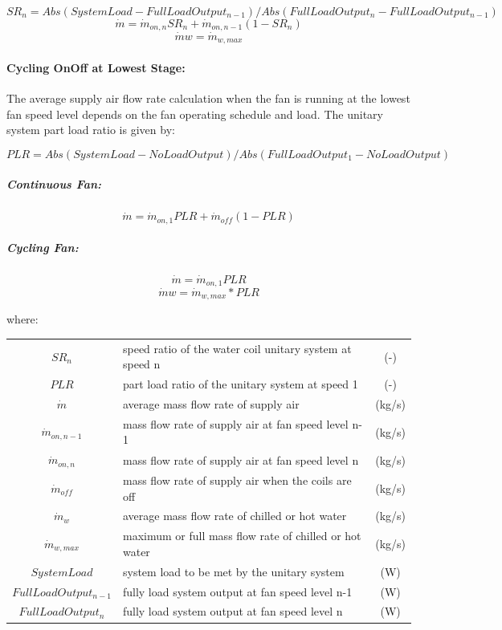\[{SR_{n}} = Abs({SystemLoad} - {FullLoadOutput_{n-1}}) / Abs({FullLoadOutput_{n}} - {FullLoadOutput_{n-1}})\] \[{\dot m} = {\dot m_{on, n}} {SR_{n}} + {\dot m_{on, n-1}} (1 - {SR_{n}})\] \[{\dot m{w}} = {\dot m_{w, max}}\]

\paragraph{Cycling OnOff at Lowest Stage:}\label{cycling-onoff-at-lowest-stage}

The average supply air flow rate calculation when the fan is running at the lowest fan speed level depends on the fan operating schedule and load. The unitary system part load ratio is given by:

\begin{equation}
{PLR} = Abs({SystemLoad} - {NoLoadOutput}) / Abs({FullLoadOutput_{1}} - {NoLoadOutput})
\end{equation}

\subparagraph{Continuous Fan:}\label{continuous-fan}

\begin{equation}
{\dot m} = {\dot m_{on, 1}} {PLR} + {\dot m_{off}} (1 - {PLR})
\end{equation}

\subparagraph{Cycling Fan:}\label{cycling-fan}

\[{\dot m} = {\dot m_{on, 1}} {PLR}\] \[{\dot m{w}} = {\dot m_{w, max}} * {PLR}\]

where:

\begin{tabular}{clc}
  $SR_n$ & speed ratio of the water coil unitary system at speed n & (-) \\
  $PLR$ & part load ratio of the unitary system at speed 1 & (-) \\
  $\dot{m}$ & average mass flow rate of supply air & (kg/s) \\
  $\dot{m}_{on, n-1}$ & mass flow rate of supply air at fan speed level n-1 & (kg/s) \\
  $\dot{m}_{on, n}$ & mass flow rate of supply air at fan speed level n & (kg/s) \\
  $\dot{m}_{off}$ & mass flow rate of supply air when the coils are off & (kg/s) \\
  $\dot{m}_{w}$ & average mass flow rate of chilled or hot water & (kg/s) \\
  $\dot{m}_{w, max}$ & maximum or full mass flow rate of chilled or hot water & (kg/s) \\
  $SystemLoad$ & system load to be met by the unitary system & (W) \\
  $FullLoadOutput_{n-1}$ & fully load system output at fan speed level n-1 & (W) \\
  $FullLoadOutput_{n}$ & fully load system output at fan speed level n & (W)
\end{tabular}

